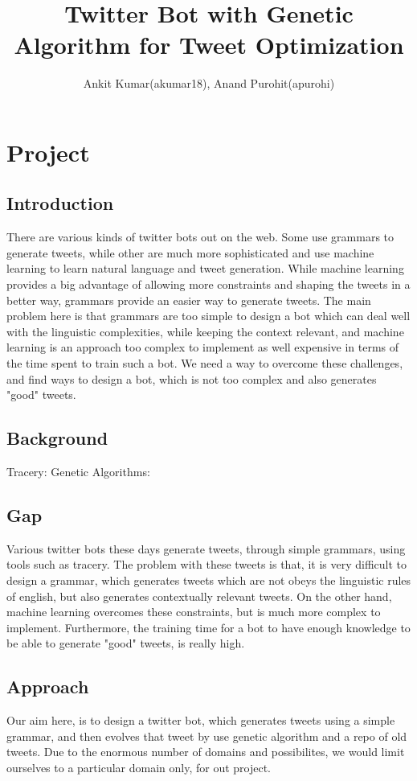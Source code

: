 \documentclass[11pt]{article}
\title{Twitter Bot with Genetic Algorithm for Tweet Optimization}
\author{Ankit Kumar(akumar18), Anand Purohit(apurohi)}
\date{}
\begin{document}
    \maketitle

    \section{Project}
        \subsection{Introduction}
        There are various kinds of twitter bots out on the web. Some use grammars to generate tweets, while other are much more sophisticated and use machine learning to learn natural language and tweet generation. While machine learning provides a big advantage of allowing more constraints and shaping the tweets in a better way, grammars provide an easier way to generate tweets.
        The main problem here is that grammars are too simple to design a bot which can deal well with the linguistic complexities, while keeping the context relevant, and machine learning is an approach too complex to implement as well expensive in terms of the time spent to train such a bot. We need a way to overcome these challenges, and find ways to design a bot, which is not too complex and also generates "good" tweets.

        \subsection{Background}
        Tracery: 
        \newline
        Genetic Algorithms:
        

        \subsection{Gap}
        Various twitter bots these days generate tweets, through simple grammars, using tools such as tracery. The problem with these tweets is that, it is very difficult to design a grammar, which generates tweets which are not obeys the linguistic rules of english, but also generates contextually relevant tweets.
        On the other hand, machine learning overcomes these constraints, but is much more complex to implement. Furthermore, the training time for a bot to have enough knowledge to be able to generate "good" tweets, is really high.

        \subsection{Approach}
        Our aim here, is to design a twitter bot, which generates tweets using a simple grammar, and then evolves that tweet by use genetic algorithm and a repo of old tweets. Due to the enormous number of domains and possibilites, we would limit ourselves to a particular domain only, for out project.
\end{document}
